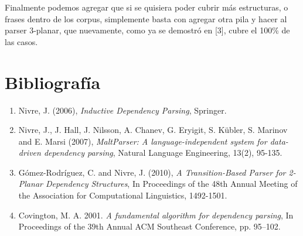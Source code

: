 \documentclass[11pt,a4paper,spanish]{article}
\begin{document}
Finalmente podemos agregar que si se quisiera poder cubrir más estructuras, o frases dentro de los corpus, simplemente basta con agregar otra pila y hacer al parser 3-planar, que nuevamente, como ya se demostró en [3], cubre el 100\% de las casos.

\newpage
\section{Bibliografía}

\begin{enumerate}
\item Nivre, J. (2006), \emph{Inductive Dependency Parsing}, Springer.
\item Nivre, J., J. Hall, J. Nilsson, A. Chanev, G. Eryigit, S. Kübler, S. Marinov and E. Marsi (2007), \emph{MaltParser: A language-independent system for data-driven dependency parsing}, Natural Language Engineering, 13(2), 95-135.
\item Gómez-Rodríguez, C. and Nivre, J. (2010), \emph{A Transition-Based Parser for 2-Planar Dependency Structures}, In Proceedings of the 48th Annual Meeting of the Association for Computational Linguistics, 1492-1501.
\item Covington, M. A. 2001. \emph{A fundamental algorithm for dependency parsing}, In Proceedings of the 39th Annual ACM Southeast Conference, pp. 95–102.
\end{enumerate}
\end{document}
